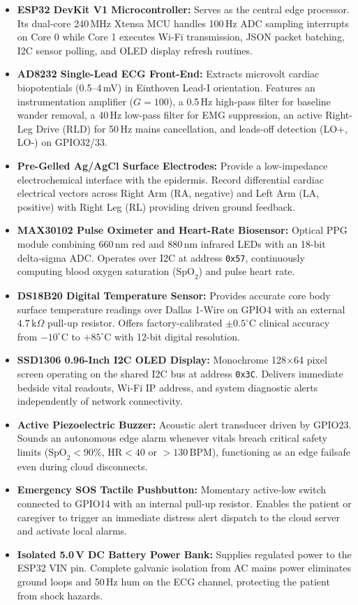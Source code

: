 \documentclass[12pt]{article}
\begin{document}
\begin{itemize}[itemsep=2.0pt, parsep=0pt, topsep=1.5pt]
    \item \textbf{ESP32 DevKit V1 Microcontroller:} Serves as the central edge processor. Its dual-core 240\,MHz Xtensa MCU handles 100\,Hz ADC sampling interrupts on Core 0 while Core 1 executes Wi-Fi transmission, JSON packet batching, I2C sensor polling, and OLED display refresh routines.
    \item \textbf{AD8232 Single-Lead ECG Front-End:} Extracts microvolt cardiac biopotentials (0.5--4\,mV) in Einthoven Lead-I orientation. Features an instrumentation amplifier ($G = 100$), a 0.5\,Hz high-pass filter for baseline wander removal, a 40\,Hz low-pass filter for EMG suppression, an active Right-Leg Drive (RLD) for 50\,Hz mains cancellation, and leads-off detection (LO+, LO-) on GPIO32/33.
    \item \textbf{Pre-Gelled Ag/AgCl Surface Electrodes:} Provide a low-impedance electrochemical interface with the epidermis. Record differential cardiac electrical vectors across Right Arm (RA, negative) and Left Arm (LA, positive) with Right Leg (RL) providing driven ground feedback.
    \item \textbf{MAX30102 Pulse Oximeter and Heart-Rate Biosensor:} Optical PPG module combining 660\,nm red and 880\,nm infrared LEDs with an 18-bit delta-sigma ADC. Operates over I2C at address \texttt{0x57}, continuously computing blood oxygen saturation ($\text{SpO}_2$) and pulse heart rate.
    \item \textbf{DS18B20 Digital Temperature Sensor:} Provides accurate core body surface temperature readings over Dallas 1-Wire on GPIO4 with an external $4.7\,\text{k}\Omega$ pull-up resistor. Offers factory-calibrated $\pm0.5^\circ\text{C}$ clinical accuracy from $-10^\circ\text{C}$ to $+85^\circ\text{C}$ with 12-bit digital resolution.
    \item \textbf{SSD1306 0.96-Inch I2C OLED Display:} Monochrome 128$\times$64 pixel screen operating on the shared I2C bus at address \texttt{0x3C}. Delivers immediate bedside vital readouts, Wi-Fi IP address, and system diagnostic alerts independently of network connectivity.
    \item \textbf{Active Piezoelectric Buzzer:} Acoustic alert transducer driven by GPIO23. Sounds an autonomous edge alarm whenever vitals breach critical safety limits ($\text{SpO}_2 < 90\%$, $\text{HR} < 40$ or $>130\,\text{BPM}$), functioning as an edge failsafe even during cloud disconnects.
    \item \textbf{Emergency SOS Tactile Pushbutton:} Momentary active-low switch connected to GPIO14 with an internal pull-up resistor. Enables the patient or caregiver to trigger an immediate distress alert dispatch to the cloud server and activate local alarms.
    \item \textbf{Isolated 5.0\,V DC Battery Power Bank:} Supplies regulated power to the ESP32 VIN pin. Complete galvanic isolation from AC mains power eliminates ground loops and 50\,Hz hum on the ECG channel, protecting the patient from shock hazards.
\end{itemize}
\clearpage
\end{document}
